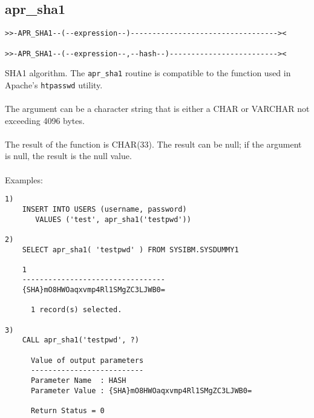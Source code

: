 \subsection{apr\_sha1} \label{aprsha1}
\begin{verbatim}
>>-APR_SHA1--(--expression--)----------------------------------><

>>-APR_SHA1--(--expression--,--hash--)-------------------------><
\end{verbatim}
SHA1 algorithm. The {\tt apr\_sha1} routine is compatible to the function used in Apache's {\tt htpasswd} utility.\\
\\
The argument can be a character string that is either a \mbox{CHAR} or \mbox{VARCHAR} not exceeding 4096 bytes.\\
\\
The result of the function is CHAR(33). The result can be null; if the argument is null, the result is the null value.\\
\\
Examples:
\begin{verbatim}
1)
    INSERT INTO USERS (username, password)
       VALUES ('test', apr_sha1('testpwd'))

2)
    SELECT apr_sha1( 'testpwd' ) FROM SYSIBM.SYSDUMMY1

    1
    ---------------------------------
    {SHA}mO8HWOaqxvmp4Rl1SMgZC3LJWB0=

      1 record(s) selected.

3)
    CALL apr_sha1('testpwd', ?)

      Value of output parameters
      --------------------------
      Parameter Name  : HASH
      Parameter Value : {SHA}mO8HWOaqxvmp4Rl1SMgZC3LJWB0=

      Return Status = 0
\end{verbatim}
\newpage
\hypertarget{haprsha256}{}
